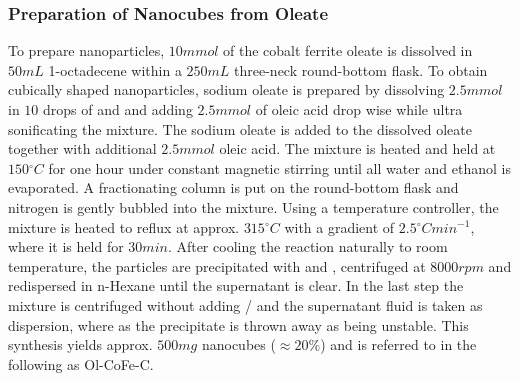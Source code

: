 \documentclass[\main/dresen_thesis.tex]{subfiles}
\begin{document}
    \subsubsection{Preparation of Nanocubes from Oleate}
      To prepare nanoparticles, $10 \unit{mmol}$ of the cobalt ferrite oleate is dissolved in $50 \unit{mL}$ 1-octadecene within a $250 \unit{mL}$ three-neck round-bottom flask.
      To obtain cubically shaped nanoparticles, sodium oleate is prepared by dissolving $2.5 \unit{mmol}$  in $10$ drops of  and  and adding $2.5 \unit{mmol}$ of oleic acid drop wise while ultra sonificating the mixture.
      The sodium oleate is added to the dissolved oleate together with additional $2.5 \unit{mmol}$ oleic acid.
      The mixture is heated and held at $150 \unit{^\circ C}$ for one hour under constant magnetic stirring until all water and ethanol is evaporated.
      A fractionating column is put on the round-bottom flask and nitrogen is gently bubbled into the mixture.
      Using a temperature controller, the mixture is heated to reflux at approx. $315 \unit{^\circ C}$ with a gradient of $2.5 \unit{^\circ C min^{-1}}$, where it is held for $30 \unit{min}$.
      After cooling the reaction naturally to room temperature, the particles are precipitated with  and , centrifuged at $8000 \unit{rpm}$ and redispersed in n-Hexane until the supernatant is clear.
      In the last step the mixture is centrifuged without adding / and the supernatant fluid is taken as dispersion, where as the precipitate is thrown away as being unstable.
      This synthesis yields approx. $500 \unit{mg}$ nanocubes ($\approx 20 \%$) and is referred to in the following as Ol-CoFe-C.
\end{document}
